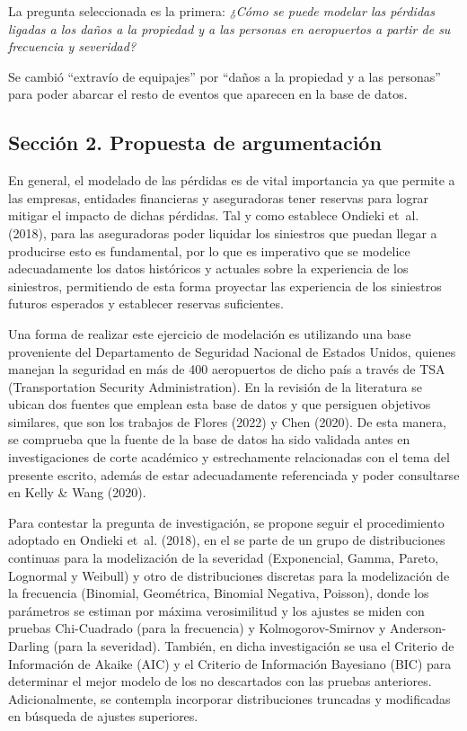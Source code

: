 \documentclass[
  letterpaper,
  onepage,
  openany]{scrreprt}
\begin{document}
La pregunta seleccionada es la primera: \emph{¿Cómo se puede modelar las
pérdidas ligadas a los daños a la propiedad y a las personas en
aeropuertos a partir de su frecuencia y severidad?}

Se cambió ``extravío de equipajes'' por ``daños a la propiedad y a las
personas'' para poder abarcar el resto de eventos que aparecen en la
base de datos.

\hypertarget{secciuxf3n-2.-propuesta-de-argumentaciuxf3n}{%
\subsection{Sección 2. Propuesta de
argumentación}\label{secciuxf3n-2.-propuesta-de-argumentaciuxf3n}}

En general, el modelado de las pérdidas es de vital importancia ya que
permite a las empresas, entidades financieras y aseguradoras tener
reservas para lograr mitigar el impacto de dichas pérdidas. Tal y como
establece Ondieki et~al. (2018), para las aseguradoras poder liquidar
los siniestros que puedan llegar a producirse esto es fundamental, por
lo que es imperativo que se modelice adecuadamente los datos históricos
y actuales sobre la experiencia de los siniestros, permitiendo de esta
forma proyectar las experiencia de los siniestros futuros esperados y
establecer reservas suficientes.

Una forma de realizar este ejercicio de modelación es utilizando una
base proveniente del Departamento de Seguridad Nacional de Estados
Unidos, quienes manejan la seguridad en más de 400 aeropuertos de dicho
país a través de TSA (Transportation Security Administration). En la
revisión de la literatura se ubican dos fuentes que emplean esta base de
datos y que persiguen objetivos similares, que son los trabajos de
Flores (2022) y Chen (2020). De esta manera, se comprueba que la fuente
de la base de datos ha sido validada antes en investigaciones de corte
académico y estrechamente relacionadas con el tema del presente escrito,
además de estar adecuadamente referenciada y poder consultarse en Kelly
\& Wang (2020).

Para contestar la pregunta de investigación, se propone seguir el
procedimiento adoptado en Ondieki et~al. (2018), en el se parte de un
grupo de distribuciones continuas para la modelización de la severidad
(Exponencial, Gamma, Pareto, Lognormal y Weibull) y otro de
distribuciones discretas para la modelización de la frecuencia
(Binomial, Geométrica, Binomial Negativa, Poisson), donde los parámetros
se estiman por máxima verosimilitud y los ajustes se miden con pruebas
Chi-Cuadrado (para la frecuencia) y Kolmogorov-Smirnov y
Anderson-Darling (para la severidad). También, en dicha investigación se
usa el Criterio de Información de Akaike (AIC) y el Criterio de
Información Bayesiano (BIC) para determinar el mejor modelo de los no
descartados con las pruebas anteriores. Adicionalmente, se contempla
incorporar distribuciones truncadas y modificadas en búsqueda de ajustes
superiores.
\end{document}
